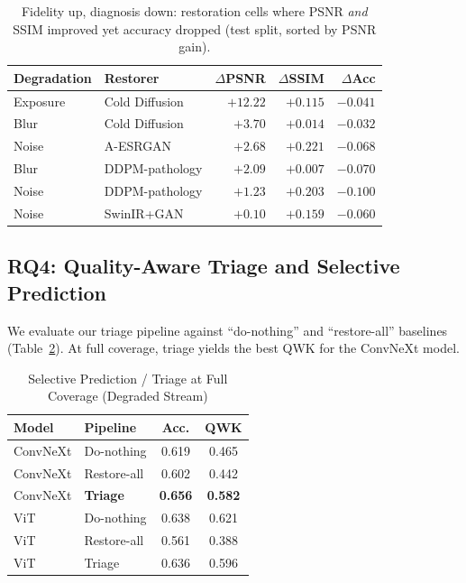 \documentclass[runningheads]{llncs}
\begin{document}
\begin{table}[!t]
\caption{Fidelity up, diagnosis down: restoration cells where PSNR \textit{and} SSIM improved yet accuracy dropped (test split, sorted by PSNR gain).}
\label{tab:fidelity_paradox}
\begin{center}
\begin{tabular}{llrrr}
\toprule
\textbf{Degradation} & \textbf{Restorer} & \textbf{$\Delta$PSNR} & \textbf{$\Delta$SSIM} & \textbf{$\Delta$Acc} \\
\midrule
Exposure & Cold Diffusion & $+12.22$ & $+0.115$ & $-0.041$ \\
Blur & Cold Diffusion & $+3.70$ & $+0.014$ & $-0.032$ \\
Noise & A-ESRGAN & $+2.68$ & $+0.221$ & $-0.068$ \\
Blur & DDPM-pathology & $+2.09$ & $+0.007$ & $-0.070$ \\
Noise & DDPM-pathology & $+1.23$ & $+0.203$ & $-0.100$ \\
Noise & SwinIR+GAN & $+0.10$ & $+0.159$ & $-0.060$ \\
\bottomrule
\end{tabular}
\end{center}
\end{table}

\subsection{RQ4: Quality-Aware Triage and Selective Prediction}
We evaluate our triage pipeline against ``do-nothing'' and ``restore-all'' baselines (Table~\ref{tab:triage}). At full coverage, triage yields the best QWK for the ConvNeXt model.

\begin{table}[!t]
\caption{Selective Prediction / Triage at Full Coverage (Degraded Stream)}
\label{tab:triage}
\begin{center}
\begin{tabular}{llcc}
\toprule
\textbf{Model} & \textbf{Pipeline} & \textbf{Acc.} & \textbf{QWK} \\
\midrule
ConvNeXt & Do-nothing  & 0.619 & 0.465 \\
ConvNeXt & Restore-all & 0.602 & 0.442 \\
ConvNeXt & \textbf{Triage}    & \textbf{0.656} & \textbf{0.582} \\
\midrule
ViT & Do-nothing  & 0.638 & 0.621 \\
ViT & Restore-all & 0.561 & 0.388 \\
ViT & Triage      & 0.636 & 0.596 \\
\bottomrule
\end{tabular}
\end{center}
\end{table}
\end{document}
